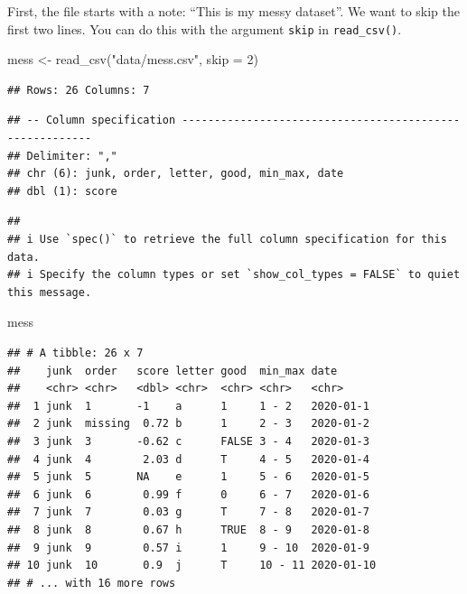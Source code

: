 \documentclass[
  oneside]{book}
\newenvironment{Shaded}{\begin{snugshade}}{\end{snugshade}}
\newcommand{\AttributeTok}[1]{\textcolor[rgb]{0.77,0.63,0.00}{#1}}
\newcommand{\DecValTok}[1]{\textcolor[rgb]{0.00,0.00,0.81}{#1}}
\newcommand{\FunctionTok}[1]{\textcolor[rgb]{0.00,0.00,0.00}{#1}}
\newcommand{\NormalTok}[1]{#1}
\newcommand{\OtherTok}[1]{\textcolor[rgb]{0.56,0.35,0.01}{#1}}
\newcommand{\StringTok}[1]{\textcolor[rgb]{0.31,0.60,0.02}{#1}}
\begin{document}
First, the file starts with a note: ``This is my messy dataset''. We want to skip the first two lines. You can do this with the argument \texttt{skip} in \texttt{read\_csv()}.

\begin{Shaded}
\begin{Highlighting}[]
\NormalTok{mess }\OtherTok{\textless{}{-}} \FunctionTok{read\_csv}\NormalTok{(}\StringTok{"data/mess.csv"}\NormalTok{, }\AttributeTok{skip =} \DecValTok{2}\NormalTok{)}
\end{Highlighting}
\end{Shaded}

\begin{verbatim}
## Rows: 26 Columns: 7
\end{verbatim}

\begin{verbatim}
## -- Column specification --------------------------------------------------------
## Delimiter: ","
## chr (6): junk, order, letter, good, min_max, date
## dbl (1): score
\end{verbatim}

\begin{verbatim}
## 
## i Use `spec()` to retrieve the full column specification for this data.
## i Specify the column types or set `show_col_types = FALSE` to quiet this message.
\end{verbatim}

\begin{Shaded}
\begin{Highlighting}[]
\NormalTok{mess}
\end{Highlighting}
\end{Shaded}

\begin{verbatim}
## # A tibble: 26 x 7
##    junk  order   score letter good  min_max date      
##    <chr> <chr>   <dbl> <chr>  <chr> <chr>   <chr>     
##  1 junk  1       -1    a      1     1 - 2   2020-01-1 
##  2 junk  missing  0.72 b      1     2 - 3   2020-01-2 
##  3 junk  3       -0.62 c      FALSE 3 - 4   2020-01-3 
##  4 junk  4        2.03 d      T     4 - 5   2020-01-4 
##  5 junk  5       NA    e      1     5 - 6   2020-01-5 
##  6 junk  6        0.99 f      0     6 - 7   2020-01-6 
##  7 junk  7        0.03 g      T     7 - 8   2020-01-7 
##  8 junk  8        0.67 h      TRUE  8 - 9   2020-01-8 
##  9 junk  9        0.57 i      1     9 - 10  2020-01-9 
## 10 junk  10       0.9  j      T     10 - 11 2020-01-10
## # ... with 16 more rows
\end{verbatim}
\end{document}
